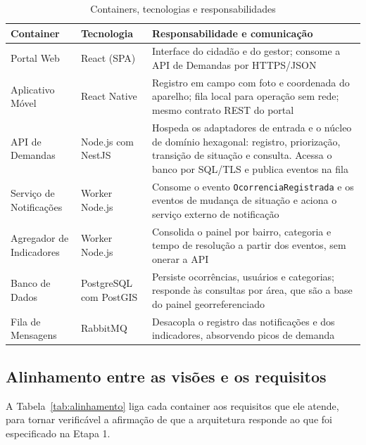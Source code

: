 \documentclass[12pt,a4paper,oneside]{article}
\newcommand{\fonte}[1]{\par\vspace{5pt}{\footnotesize\singlespacing Fonte: #1\par}}
\newcommand{\cab}[1]{\textbf{\footnotesize #1}}
\begin{document}
\begin{table}[H]
\centering
\caption{Containers, tecnologias e responsabilidades}
\label{tab:containers}
{\small\singlespacing
\begin{tabularx}{\textwidth}{L{2.9cm} L{3.0cm} X}
\toprule
\cab{Container} & \cab{Tecnologia} & \cab{Responsabilidade e comunicação} \\
\midrule
Portal Web & React (SPA) & Interface do cidadão e do gestor; consome a API de
Demandas por HTTPS/JSON \\
Aplicativo Móvel & React Native & Registro em campo com foto e coordenada do
aparelho; fila local para operação sem rede; mesmo contrato REST do portal \\
API de Demandas & Node.js com NestJS & Hospeda os adaptadores de entrada e o
núcleo de domínio hexagonal: registro, priorização, transição de situação e
consulta. Acessa o banco por SQL/TLS e publica eventos na fila \\
Serviço de Notificações & Worker Node.js & Consome o evento
\texttt{OcorrenciaRegistrada} e os eventos de mudança de situação e aciona o
serviço externo de notificação \\
Agregador de Indicadores & Worker Node.js & Consolida o painel por bairro,
categoria e tempo de resolução a partir dos eventos, sem onerar a API \\
Banco de Dados & PostgreSQL com PostGIS & Persiste ocorrências, usuários e
categorias; responde às consultas por área, que são a base do painel
georreferenciado \\
Fila de Mensagens & RabbitMQ & Desacopla o registro das notificações e dos
indicadores, absorvendo picos de demanda \\
\bottomrule
\end{tabularx}}
\fonte{elaborado pelos autores (2026).}
\end{table}

\subsection{Alinhamento entre as visões e os requisitos}

A Tabela~\ref{tab:alinhamento} liga cada container aos requisitos que ele
atende, para tornar verificável a afirmação de que a arquitetura responde ao que
foi especificado na Etapa 1.
\end{document}
